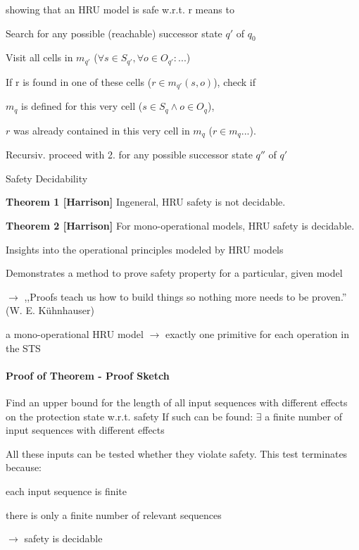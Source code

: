 \documentclass[a4paper]{article}
\renewcommand{\note}[2]{\begin{noteBox} \textbf{#1} #2 \end{noteBox}}
\begin{document}
\begin{multicols}{3}
    showing that an HRU model is safe w.r.t. r means to
    \begin{enumerate*}
        \item Search for any possible (reachable) successor state $q'$ of $q_0$
        \item Visit all cells in $m_{q'}$ ($\forall s\in S_{q'},\forall o\in O_{q'}:...$)
        \item If r is found in one of these cells ($r\in m_{q'}(s,o)$), check if
        \begin{itemize*}
            \item $m_q$ is defined for this very cell ($s\in S_q\wedge o\in O_q$),
            \item $r$ was already contained in this very cell in $m_q$ ($r\in m_q...$).
        \end{itemize*}
        \item Recursiv. proceed with 2. for any possible successor state $q''$ of $q'$
    \end{enumerate*}

    Safety Decidability
    \note{Theorem 1 [Harrison]}{Ingeneral, HRU safety is not decidable.}

    \note{Theorem 2 [Harrison]}{For mono-operational models, HRU safety is decidable.}
    \begin{itemize*}
        \item Insights into the operational principles modeled by HRU models
        \item Demonstrates a method to prove safety property for a particular, given model
        \item $\rightarrow$ ,,Proofs teach us how to build things so nothing more needs to be proven.'' (W. E. Kühnhauser)
    \end{itemize*}

    a mono-operational HRU model $\rightarrow$  exactly one primitive for each operation in the STS

    \paragraph{Proof of Theorem - Proof Sketch}
    \begin{enumerate*}
        \item Find an upper bound for the length of all input sequences with different effects on the protection state w.r.t. safety
        If such can be found: $\exists$ a finite number of input sequences with different effects
        \item All these inputs can be tested whether they violate safety. This test terminates because:
        \begin{itemize*}
            \item each input sequence is finite
            \item there is only a finite number of relevant sequences
        \end{itemize*}
        \item $\rightarrow$ safety is decidable
    \end{enumerate*}


\end{multicols}
\end{document}
